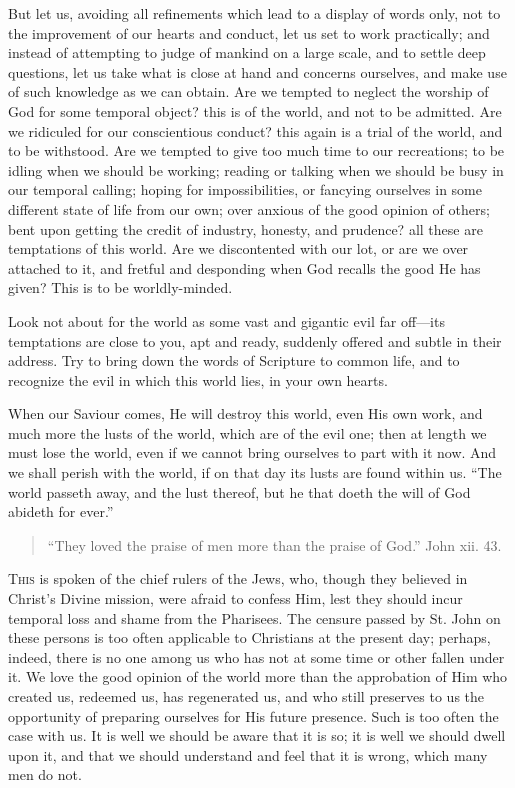 But let us, avoiding all refinements which lead to a display of
words only, not to the improvement of our hearts and conduct, let us
set to work practically; and instead of attempting to judge of mankind
on a large scale, and to settle deep questions, let us take what is
close at hand and concerns ourselves, and make use of such knowledge
as we can obtain. Are we tempted to neglect the worship of God for
some temporal object? this is of the world, and not to be admitted.
Are we ridiculed for our conscientious conduct? this again is a trial
of the world, and to be withstood. Are we tempted to give too much
time to our recreations; to be idling when we should be working;
reading or talking when we should be busy in our temporal calling;
hoping for impossibilities, or fancying ourselves in some different
state of life from our own; over anxious of the good opinion of
others; bent upon getting the credit of industry, honesty, and
prudence? all these are temptations of this world. Are we discontented
with our lot, or are we over attached to it, and fretful and
desponding when God recalls the good He has given? This is to be
worldly-minded.

Look not about for the world as some vast and gigantic evil far off—its
temptations are close to you, apt and ready, suddenly offered and
subtle in their address. Try to bring down the words of Scripture to
common life, and to recognize the evil in which this world lies, in
your own hearts.

When our Saviour comes, He will destroy this world, even His own
work, and much more the lusts of the world, which are of the evil one;
then at length we must lose the world, even if we cannot bring
ourselves to part with it now. And we shall perish with the world, if
on that day its lusts are found within us. ``The world passeth
away, and the lust thereof, but he that doeth the will of God abideth
for ever.''


\begin{quote}

``They loved the praise of men more than the praise of
God.'' John xii. 43.

\end{quote}

T\textsc{his} is spoken of the chief rulers of the Jews, who, though they
believed in Christ's Divine mission, were afraid to confess Him, lest
they should incur temporal loss and shame from the Pharisees. The
censure passed by St. John on these persons is too often applicable to
Christians at the present day; perhaps, indeed, there is no one among
us who has not at some time or other fallen under it. We love the good
opinion of the world more than the approbation of Him who created us,
redeemed us, has regenerated us, and who still preserves to us the
opportunity of preparing ourselves for His future presence. Such is
too often the case with us. It is well we should be aware that it is
so; it is well we should dwell upon it, and that we should understand
and feel that it is wrong, which many men do not.

